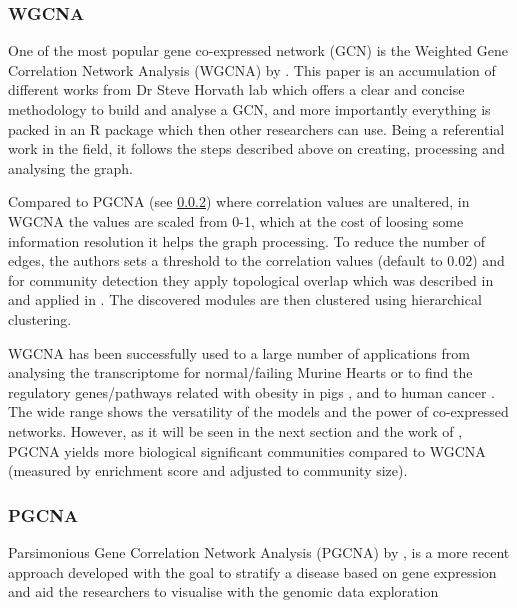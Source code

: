 


\subsubsection{WGCNA} \label{s:lit:WGCNA}

One of the most popular gene co-expressed network (GCN) is the Weighted Gene Correlation Network Analysis (WGCNA) by \citet{Langfelder2008-sn}. This paper is an accumulation of different works from Dr Steve Horvath lab which offers a clear and concise methodology to build and analyse a GCN, and more importantly everything is packed in an R package which then other researchers can use. Being a referential work in the field, it follows the steps described above on creating, processing and analysing the graph.

Compared to PGCNA (see \ref{s:lit:pgcna}) where correlation values are unaltered, in WGCNA the values are scaled from 0-1, which at the cost of loosing some information resolution it helps the graph processing. To reduce the number of edges, the authors sets a threshold to the correlation values (default to $0.02$) and for community detection they apply topological overlap which was described in \citet{Zhang2005-xq} and applied in \cite{Yip2007-mr, Li2007-vz, Ravasz2002-au}. The discovered modules are then clustered using hierarchical clustering.

WGCNA has been successfully used to a large number of applications from analysing the transcriptome for normal/failing Murine Hearts \citet{Lee2011-wm} or to find the regulatory genes/pathways related with obesity in pigs \citet{Kogelman2014-ea}, and to human cancer \cite{Yang2014-wv, Clarke2013-wd, Care2019-ij}. The wide range shows the versatility of the models and the power of co-expressed networks. However, as it will be seen in the next section and the work of \citet{Care2019-ij}, PGCNA yields more biological significant communities compared to WGCNA (measured by enrichment score and adjusted to community size).

\subsubsection{PGCNA} \label{s:lit:pgcna}

Parsimonious Gene Correlation Network Analysis (PGCNA) by \citet{Care2019-ij}, is a more recent  approach developed with the goal to stratify a disease based on gene expression and aid the researchers to visualise with the genomic data exploration

